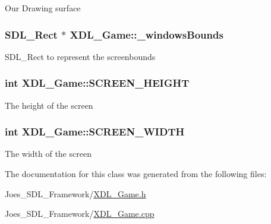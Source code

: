 Our Drawing surface \hypertarget{class_x_d_l___game_aba18e8d33ee6e87494ebb958f2beee67}{
\subsubsection[{\-\_\-windows\-Bounds}]{\setlength{\rightskip}{0pt plus 5cm}S\-D\-L\-\_\-\-Rect $\ast$ X\-D\-L\-\_\-\-Game\-::\-\_\-windows\-Bounds\hspace{0.3cm}{\ttfamily [static]}}}\label{class_x_d_l___game_aba18e8d33ee6e87494ebb958f2beee67}
S\-D\-L\-\_\-\-Rect to represent the screenbounds \hypertarget{class_x_d_l___game_a9fde7fa33a7816a1e3f17313ebca9001}{
\subsubsection[{S\-C\-R\-E\-E\-N\-\_\-\-H\-E\-I\-G\-H\-T}]{\setlength{\rightskip}{0pt plus 5cm}int X\-D\-L\-\_\-\-Game\-::\-S\-C\-R\-E\-E\-N\-\_\-\-H\-E\-I\-G\-H\-T\hspace{0.3cm}{\ttfamily [static]}}}\label{class_x_d_l___game_a9fde7fa33a7816a1e3f17313ebca9001}
The height of the screen \hypertarget{class_x_d_l___game_a2168cd95816117ff5f905692439aeb72}{
\subsubsection[{S\-C\-R\-E\-E\-N\-\_\-\-W\-I\-D\-T\-H}]{\setlength{\rightskip}{0pt plus 5cm}int X\-D\-L\-\_\-\-Game\-::\-S\-C\-R\-E\-E\-N\-\_\-\-W\-I\-D\-T\-H\hspace{0.3cm}{\ttfamily [static]}}}\label{class_x_d_l___game_a2168cd95816117ff5f905692439aeb72}
The width of the screen 

The documentation for this class was generated from the following files\-:\begin{DoxyCompactItemize}
\item 
Joes\-\_\-\-S\-D\-L\-\_\-\-Framework/\hyperlink{_x_d_l___game_8h}{X\-D\-L\-\_\-\-Game.\-h}\item 
Joes\-\_\-\-S\-D\-L\-\_\-\-Framework/\hyperlink{_x_d_l___game_8cpp}{X\-D\-L\-\_\-\-Game.\-cpp}\end{DoxyCompactItemize}
